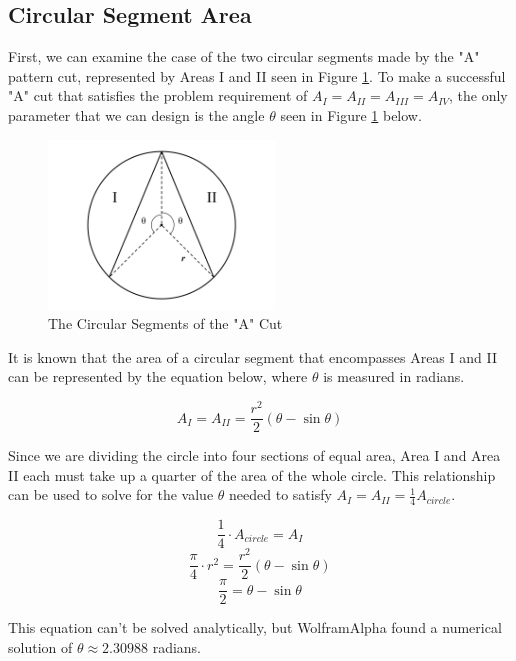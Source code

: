 \documentclass[a4paper,11pt]{article}
\begin{document}
\subsection*{Circular Segment Area}

\hspace{\parindent}First, we can examine the case of the two circular segments made by the "A" pattern cut, represented by Areas I and II seen in Figure \ref{fig:segmentArea}.  To make a successful "A" cut that satisfies the problem requirement of $A_I=A_{II}=A_{III}=A_{IV}$, the only parameter that we can design is the angle $\theta$ seen in Figure \ref{fig:segmentArea} below.

\begin{figure}[htp]
    \centering
    \includegraphics[width=6cm]{Images/2020_05_22_Riddler_Express_CircleSectors.png}
    \caption{The Circular Segments of the "A" Cut}
    \label{fig:segmentArea}
\end{figure}

It is known that the area of a circular segment that encompasses Areas I and II can be represented by the equation below, where $\theta$ is measured in radians.

\[A_I = A_{II} = \frac{r^2}{2}(\theta - \sin{\theta})\]


Since we are dividing the circle into four sections of equal area, Area I and Area II each must take up a quarter of the area of the whole circle.  This relationship can be used to solve for the value $\theta$ needed to satisfy $A_{I}=A_{II}=\frac{1}{4}A_{circle}$.


\[\frac{1}{4}\cdot A_{circle} = A_{I}\]
\[\frac{\pi}{4} \cdot r^2= \frac{r^2}{2}(\theta - \sin{\theta})\]
\[\frac{\pi}{2} = \theta - \sin{\theta}\]

This equation can't be solved analytically, but WolframAlpha found a numerical solution of $\theta \approx 2.30988$ radians.\newline\newline\newline
\end{document}
